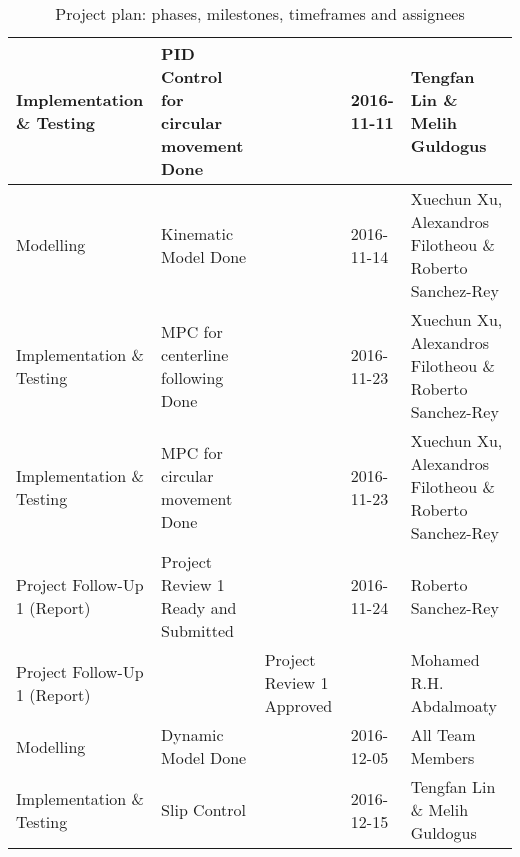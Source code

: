\begin{landscape}
\begin{table}
\begin{tabularx}{\linewidth}{l|X|X|X|X}
    Implementation \& Testing       & PID Control for circular movement Done              & ~                                             & 2016-11-11 & Tengfan Lin \& Melih Guldogus                            \\ \hline
    Modelling                       & Kinematic Model Done                                & ~                                             & 2016-11-14 & Xuechun Xu, Alexandros Filotheou \& Roberto Sanchez-Rey  \\ \hline
    Implementation \& Testing       & MPC for centerline following Done                   & ~                                             & 2016-11-23 & Xuechun Xu, Alexandros Filotheou \& Roberto Sanchez-Rey  \\
    Implementation \& Testing       & MPC for circular movement Done                      & ~                                             & 2016-11-23 & Xuechun Xu, Alexandros Filotheou \& Roberto Sanchez-Rey  \\ \hline
    Project Follow-Up 1 (Report)    & Project Review 1 Ready and Submitted                & ~                                             & 2016-11-24 & Roberto Sanchez-Rey                                      \\
    Project Follow-Up 1 (Report)    & ~                                                   & Project Review 1 Approved                     & ~          & Mohamed R.H. Abdalmoaty                                  \\ \hline
    Modelling                       & Dynamic Model Done                                  & ~                                             & 2016-12-05 & All Team Members                                         \\ \hline
    Implementation \& Testing       & Slip Control                                        & ~                                             & 2016-12-15 & Tengfan Lin \& Melih Guldogus                            \\ \hline
\end{tabularx}
\caption{Project plan: phases, milestones, timeframes and assignees}
\label{tbl:project_plan_1}
\end{table}
\end{landscape}


